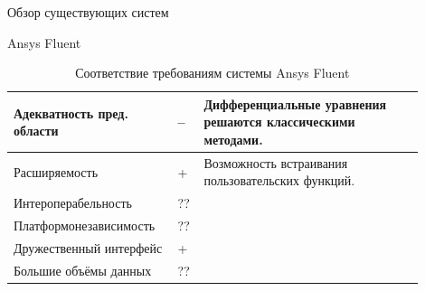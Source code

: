 \documentclass[a4paper,12pt]{extarticle}
\begin{document}
\begin{section}{Обзор существующих систем}
\begin{subsection}{Ansys Fluent}
    \begin{table}[h]
        \caption{Соответствие требованиям системы Ansys Fluent}
        \label{tabular:mirekscell}
        \begin{center}
            \begin{tabular}{|p{0.35\linewidth}|p{0.05\linewidth}|p{0.5\linewidth}|} \hline
                Адекватность пред. области & -- & Дифференциальные уравнения решаются классическими методами. \\ \hline
                Расширяемость              & + & Возможность встраивания пользовательских функций. \\ \hline
                Интероперабельность        & ?? & \\ \hline
                Платформонезависимость     & ?? & \\ \hline
                Дружественный интерфейс    & + & \\ \hline
                Большие объёмы данных      & ?? & \\ \hline
            \end{tabular}
        \end{center}
    \end{table}
\end{subsection}

\end{section}
\end{document}
